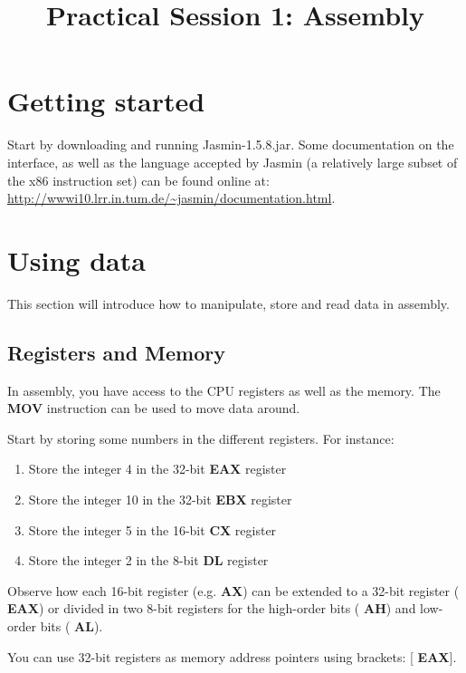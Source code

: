 \documentclass[a4paper]{article}
\title{Practical Session 1: Assembly}
\author{}
\newenvironment{instruction}%
{\vspace{15pt}
	\begin{Sbox}
		\begin{minipage}{\textwidth}}%
		{\end{minipage}
	\end{Sbox}	
\shadowbox{\TheSbox} \vspace{10pt}}
\newcommand{\asmop}[1]{{\sffamily \bfseries \color{asmblue} #1}}
\newcommand{\asmreg}[1]{{\sffamily \bfseries \color{asmgreen} #1}}
\begin{document}
\maketitle


\section{Getting started}

Start by downloading and running \textsf{Jasmin-1.5.8.jar}. Some documentation on the interface, as well as the language accepted by Jasmin (a relatively large subset of the x86 instruction set) can be found online at: \url{http://wwwi10.lrr.in.tum.de/~jasmin/documentation.html}.


\section{Using data}

This section will introduce how to manipulate, store and read data in assembly.

\subsection{Registers and Memory}

In assembly, you have access to the CPU registers as well as the memory. The \asmop{MOV} instruction can be used to move data around. 

\begin{instruction}
Start by storing some numbers in the different registers. For instance:
	\begin{enumerate}
		\item Store the integer 4 in the 32-bit \asmreg{EAX} register
		\item Store the integer 10 in the 32-bit \asmreg{EBX} register 
		\item Store the integer 5 in the 16-bit \asmreg{CX} register
		\item Store the integer 2 in the 8-bit \asmreg{DL} register
	\end{enumerate}
\end{instruction}


Observe how each 16-bit register (e.g. \asmreg{AX}) can be extended to a 32-bit register (\asmreg{EAX}) or divided in two 8-bit registers for the high-order bits (\asmreg{AH}) and low-order bits (\asmreg{AL}). 

You can use 32-bit registers as memory address pointers using brackets: [\asmreg{EAX}]. 
\end{document}
